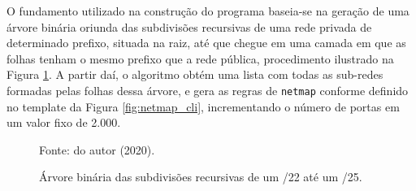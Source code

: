     O fundamento utilizado na construção do programa baseia-se na geração de uma árvore binária oriunda das subdivisões recursivas de uma rede privada de determinado prefixo, situada na raiz, até que chegue em uma camada em que as folhas tenham o mesmo prefixo que a rede pública, procedimento ilustrado na Figura \ref{fig:arvore_binaria}. A partir daí, o algoritmo obtém uma lista com todas as sub-redes formadas pelas folhas dessa árvore, e gera as regras de {\tt netmap} conforme definido no template da Figura \ref{fig:netmap_cli}, incrementando o número de portas em um valor fixo de 2.000. 
    
    \begin{figure}[!htb]
        \centering
        \caption{Árvore binária das subdivisões recursivas de um /22 até um /25.}
        \label{fig:arvore_binaria}
        
        \small

        {\small Fonte: do autor (2020).} 
    \end{figure}
    
